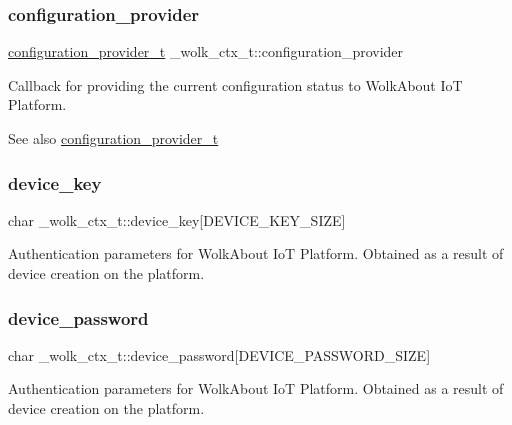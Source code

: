\subsubsection{\texorpdfstring{configuration\+\_\+provider}{configuration\_provider}}
{\footnotesize\ttfamily \hyperlink{WolkConn_8h_a64d56254d09f9e452751f32b3c5a39d3}{configuration\+\_\+provider\+\_\+t} \+\_\+wolk\+\_\+ctx\+\_\+t\+::configuration\+\_\+provider}

Callback for providing the current configuration status to Wolk\+About IoT Platform. \begin{DoxySeeAlso}{See also}
\hyperlink{WolkConn_8h_a64d56254d09f9e452751f32b3c5a39d3}{configuration\+\_\+provider\+\_\+t} 
\end{DoxySeeAlso}
\mbox{\label{struct__wolk__ctx__t_a52168fce420127bfa577ffea6fce0306}} 
\subsubsection{\texorpdfstring{device\+\_\+key}{device\_key}}
{\footnotesize\ttfamily char \+\_\+wolk\+\_\+ctx\+\_\+t\+::device\+\_\+key\mbox{[}D\+E\+V\+I\+C\+E\+\_\+\+K\+E\+Y\+\_\+\+S\+I\+ZE\mbox{]}}

Authentication parameters for Wolk\+About IoT Platform. Obtained as a result of device creation on the platform. \mbox{\label{struct__wolk__ctx__t_a3a57dc7e7475697302709e722863e736}} 
\subsubsection{\texorpdfstring{device\+\_\+password}{device\_password}}
{\footnotesize\ttfamily char \+\_\+wolk\+\_\+ctx\+\_\+t\+::device\+\_\+password\mbox{[}D\+E\+V\+I\+C\+E\+\_\+\+P\+A\+S\+S\+W\+O\+R\+D\+\_\+\+S\+I\+ZE\mbox{]}}

Authentication parameters for Wolk\+About IoT Platform. Obtained as a result of device creation on the platform. \mbox{\label{struct__wolk__ctx__t_ab98629a506ce39393254cf331189dc9a}} 
